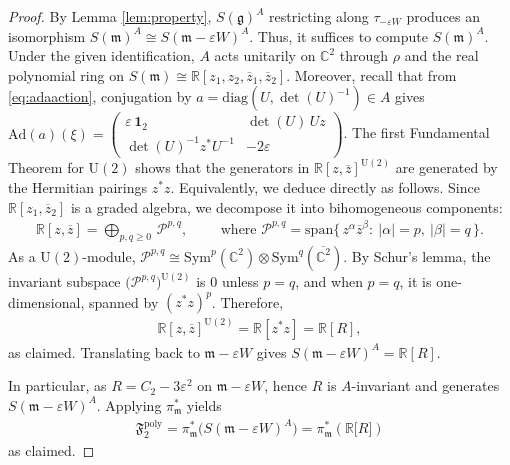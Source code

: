 \documentclass[11pt]{amsart}
\theoremstyle{definition}
\theoremstyle{plain}
\theoremstyle{conclusion}
\begin{document}
\begin{proof}
By Lemma \ref{lem:property}, $S(\mathfrak{g})^A$ restricting along $\tau_{-\varepsilon W}$ produces an isomorphism $S(\mathfrak{m})^A\cong S(\mathfrak{m}-\varepsilon W)^A$. Thus, it suffices to compute $S(\mathfrak{m})^A$. Under the given identification, $A$ acts unitarily on $\mathbb{C}^2$ through $\rho$ and the real polynomial ring on $S(\mathfrak{m}) \cong \mathbb{R}[z_1,z_2,\overline{z}_1,\overline{z}_2]$. Moreover, recall that from \eqref{eq:adaaction}, conjugation by $a=\mathrm{diag}(U,\det(U)^{-1})\in A$ gives  $\mathrm{Ad}(a)(\xi)=  \begin{pmatrix}
\varepsilon\,\mathbf{1}_2 & \det(U)\,U z\\[2pt]
\det(U)^{-1} z^* U^{-1} & -2\varepsilon
\end{pmatrix}$. The first Fundamental Theorem for $\mathrm{U}(2)$ shows that the generators in $\mathbb{R}[z,\overline{z}]^{\mathrm{U}(2)}$ are generated by the Hermitian pairings $z^* z$. Equivalently, we deduce directly as follows. Since $\mathbb{R}[z_1,\overline{z}_2]$ is a graded algebra, we decompose it into bihomogeneous components: \begin{align*}
\mathbb{R}[z,\overline{z}]=\bigoplus_{p,q\ge 0}\, \mathcal{P}^{p,q},\qquad \text{ where } \mathcal{P}^{p,q}=\mathrm{span}\{\,z^\alpha \overline{z}^\beta:\ |\alpha|=p,\ |\beta|=q\,\}.
\end{align*} As a $\mathrm{U}(2)$-module, $\mathcal{P}^{p,q}\cong \mathrm{Sym}^p(\mathbb{C}^2)\otimes \mathrm{Sym}^q(\overline{\mathbb{C}^2})$.
By Schur’s lemma, the invariant subspace $\bigl(\mathcal{P}^{p,q}\bigr)^{\mathrm{U}(2)}$ is $0$ unless $p=q$, and when $p=q$, it is one-dimensional, spanned by $(z^* z)^p$. Therefore, \begin{align*}
\mathbb{R}[z,\overline{z}]^{\mathrm{U}(2)}=\mathbb{R}[z^* z]=\mathbb{R}[R],
\end{align*} as claimed. Translating back to $\mathfrak{m}-\varepsilon W$ gives $S(\mathfrak{m}-\varepsilon W)^A=\mathbb{R}[R]$.

In particular, as $R = C_2 - 3\varepsilon^2$ on $\mathfrak{m} - \varepsilon W$, hence $R$ is $A$-invariant and generates $S(\mathfrak{m} - \varepsilon W)^A$. Applying $\pi_\mathfrak{m}^*$ yields \begin{align*}
\mathfrak{F}_2^{\mathrm{poly}}=\pi_{\mathfrak{m}}^*\bigl(S(\mathfrak{m}-\varepsilon W)^A\bigr)=\pi_{\mathfrak{m}}^*\left(\mathbb{R}\bigl[R\bigr]\right)%
\end{align*} as claimed.
\end{proof}
\end{document}
